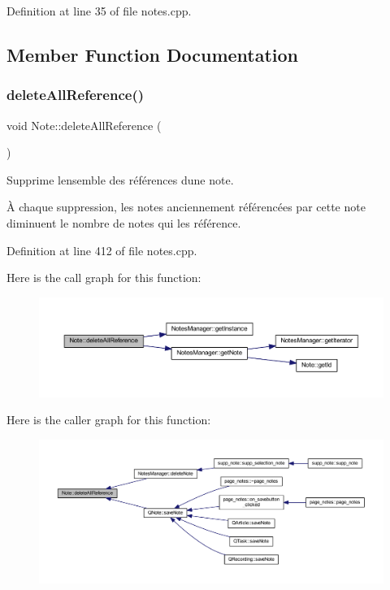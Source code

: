 Definition at line 35 of file notes.\+cpp.



\subsection{Member Function Documentation}
\mbox{\label{class_note_aacbb89b120107a4b25dd16043908c693}} 
\subsubsection{\texorpdfstring{delete\+All\+Reference()}{deleteAllReference()}}
{\footnotesize\ttfamily void Note\+::delete\+All\+Reference (\begin{DoxyParamCaption}{ }\end{DoxyParamCaption})}



Supprime l\textquotesingle{}ensemble des références d\textquotesingle{}une note. 

À chaque suppression, les notes anciennement référencées par cette note diminuent le nombre de notes qui les référence. 

Definition at line 412 of file notes.\+cpp.

Here is the call graph for this function\+:\nopagebreak
\begin{figure}[H]
\begin{center}
\leavevmode
\includegraphics[width=350pt]{class_note_aacbb89b120107a4b25dd16043908c693_cgraph}
\end{center}
\end{figure}
Here is the caller graph for this function\+:\nopagebreak
\begin{figure}[H]
\begin{center}
\leavevmode
\includegraphics[width=350pt]{class_note_aacbb89b120107a4b25dd16043908c693_icgraph}
\end{center}
\end{figure}
\mbox{\label{class_note_a91c86cf6ed18e4badb59a41e737a15fa}} 
